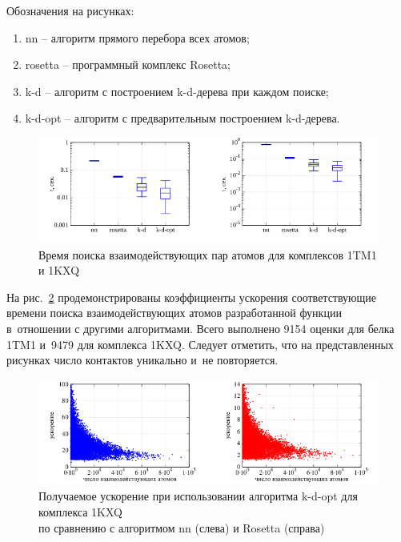 Обозначения на рисунках:
\vspace{-10pt}
\begin{enumerate}
	\setlength{\itemsep}{0pt}
	\setlength{\parskip}{0pt}	
	\item nn -- алгоритм прямого перебора всех атомов;
	\item rosetta -- программный комплекс Rosetta;
	\item k-d -- алгоритм с построением k-d-дерева при каждом поиске;
	\item k-d-opt -- алгоритм с предварительным построением k-d-дерева.
\end{enumerate}


\begin{figure}[h!]
	\captionsetup{justification=centering}
	\centering
	\includegraphics[width=1.0\linewidth]{images/bxpt.pdf}
	\caption{Время поиска взаимодействующих пар атомов для комплексов 1TM1 и 1KXQ}
	\label{belki}
\end{figure}

На рис.~\ref{acell} продемонстрированы коэффициенты ускорения соответствующие времени поиска взаимодействующих атомов разработанной функции в~отношении с другими алгоритмами. Всего выполнено 9154 оценки для белка 1TM1 и~9479 для комплекса 1KXQ. Следует отметить, что на представленных рисунках число контактов уникально и~не повторяется.

\begin{figure}[h!]
	\captionsetup{justification=centering}
	\centering
	\includegraphics[width=1.0\linewidth]{images/accel.pdf}
	\caption{Получаемое ускорение при использовании алгоритма k-d-opt для комплекса 1KXQ \\ по сравнению с алгоритмом nn (слева) и Rosetta (справа)}
	\label{acell}
\end{figure}


